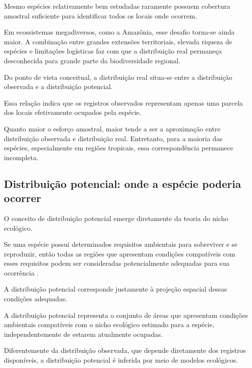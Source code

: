 Mesmo espécies relativamente bem estudadas raramente possuem cobertura amostral suficiente para identificar todos os locais onde ocorrem.

Em ecossistemas megadiversos, como a Amazônia, esse desafio torna-se ainda maior. A combinação entre grandes extensões territoriais, elevada riqueza de espécies e limitações logísticas faz com que a distribuição real permaneça desconhecida para grande parte da biodiversidade regional.

Do ponto de vista conceitual, a distribuição real situa-se entre a distribuição observada e a distribuição potencial.

\begin{equationbox}
\end{equationbox}

Essa relação indica que os registros observados representam apenas uma parcela dos locais efetivamente ocupados pela espécie.

Quanto maior o esforço amostral, maior tende a ser a aproximação entre distribuição observada e distribuição real. Entretanto, para a maioria das espécies, especialmente em regiões tropicais, essa correspondência permanece incompleta.

\subsection{Distribuição potencial: onde a espécie poderia ocorrer}

O conceito de distribuição potencial emerge diretamente da teoria do nicho ecológico.

Se uma espécie possui determinados requisitos ambientais para sobreviver e se reproduzir, então todas as regiões que apresentam condições compatíveis com esses requisitos podem ser consideradas potencialmente adequadas para sua ocorrência \parencite{peterson2011,franklin2010}.

A distribuição potencial corresponde justamente à projeção espacial dessas condições adequadas.

\begin{conceito}
	A distribuição potencial representa o conjunto de áreas que apresentam condições ambientais compatíveis com o nicho ecológico estimado para a espécie, independentemente de estarem atualmente ocupadas.
\end{conceito}

Diferentemente da distribuição observada, que depende diretamente dos registros disponíveis, a distribuição potencial é inferida por meio de modelos ecológicos.

